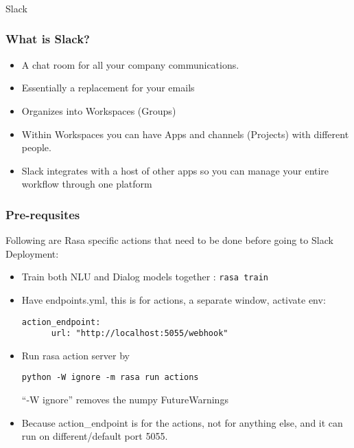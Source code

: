 \begin{frame}[fragile]\frametitle{}
\begin{center}
{\Large Slack}

\end{center}
\end{frame}

\begin{frame}[fragile]\frametitle{What is Slack?}
\begin{itemize}
\item A chat room for all your company communications.
\item Essentially a replacement for your emails
\item Organizes into Workspaces (Groups)
\item Within Workspaces you can have Apps and channels (Projects) with different people.
\item Slack integrates with a host of other apps so you can manage your entire workflow through one platform
\end{itemize}

\end{frame}

\begin{frame}[fragile]\frametitle{Pre-requsites}
Following are Rasa specific actions that need to be done before going to Slack Deployment:
\begin{itemize}
\item Train both NLU and Dialog models together : \lstinline|rasa train|
\item Have endpoints.yml, this is for actions, a separate window, activate env: 
\begin{lstlisting}
action_endpoint:
	  url: "http://localhost:5055/webhook"
\end{lstlisting}
\item Run rasa action server by
\begin{lstlisting}
python -W ignore -m rasa run actions
\end{lstlisting}
``-W ignore'' removes the numpy FutureWarnings
\item Because action\_endpoint is for the actions, not for anything else, and it can run on different/default port 5055.
\end{itemize}

\end{frame}

